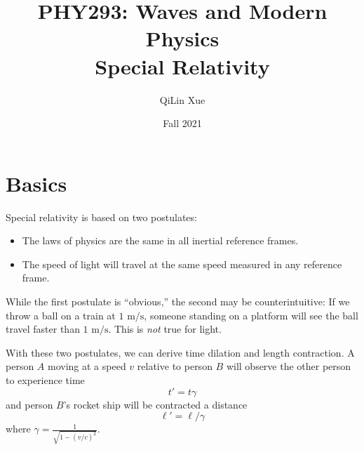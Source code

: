 \documentclass{article}
\title{PHY293: Waves and Modern Physics \\ \textbf{Special Relativity}}
\author{QiLin Xue}
\date{Fall 2021}
\begin{document}
\maketitle
\section{Basics}
Special relativity is based on two postulates:
\begin{itemize}
    \item The laws of physics are the same in all inertial reference frames.
    \item The speed of light will travel at the same speed measured in any reference frame.
\end{itemize}
While the first postulate is ``obvious,'' the second may be counterintuitive: If we throw a ball on a train at $1\text{ m/s}$, someone standing on a platform will see the ball travel faster than $1\text{ m/s}$. This is \textit{not} true for light.

With these two postulates, we can derive time dilation and length contraction. A person $A$ moving at a speed $v$ relative to person $B$ will observe the other person to experience time
\begin{equation}
    t' = t\gamma
\end{equation}
and person $B$'s rocket ship will be contracted a distance
\begin{equation}
    \ell' = \ell/\gamma
\end{equation}
where $\gamma = \frac{1}{\sqrt{1-(v/c)^2}}$.
\end{document}
